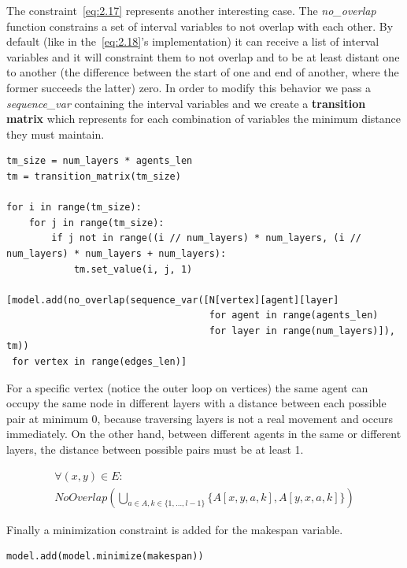 \documentclass[12pt, a4paper, hidelinks]{article}
\numberwithin{equation}{section}
\begin{document}
The constraint~\ref{eq:2.17} represents another interesting case.
The \textit{no\_overlap} function constrains a set of interval variables to not overlap with each other.
By default (like in the~\ref{eq:2.18}'s implementation) it can receive a list of interval variables and it will constraint them to not overlap and to be at least distant one to another (the difference between the start of one and end of another, where the former succeeds the latter) zero.
In order to modify this behavior we pass a \textit{sequence\_var} containing the interval variables and we create a \textbf{transition matrix} which represents for each combination of variables the minimum distance they must maintain.

\begin{lstlisting}[label={lst:minimize2}]
tm_size = num_layers * agents_len
tm = transition_matrix(tm_size)

for i in range(tm_size):
    for j in range(tm_size):
        if j not in range((i // num_layers) * num_layers, (i // num_layers) * num_layers + num_layers):
            tm.set_value(i, j, 1)

[model.add(no_overlap(sequence_var([N[vertex][agent][layer]
                                    for agent in range(agents_len)
                                    for layer in range(num_layers)]), tm))
 for vertex in range(edges_len)]
\end{lstlisting}

For a specific vertex (notice the outer loop on vertices) the same agent can occupy the same node in different layers with a distance between each possible pair at minimum 0, because traversing layers is not a real movement and occurs immediately.
On the other hand, between different agents in the same or different layers, the distance between possible pairs must be at least 1.

\begin{description}\label{eq:equation_set_2.5}
\item \begin{equation}\begin{split} \forall (x, y) \in E: \\ NoOverlap(\bigcup_{a \in A, k \in \{1,\dots,l-1\}} \{A[x,y,a,k], A[y,x,a,k]\})\end{split}\label{eq:2.18}\end{equation}
\end{description}

Finally a minimization constraint is added for the makespan variable.
\begin{lstlisting}[label={lst:minimize2}]
model.add(model.minimize(makespan))
\end{lstlisting}
\end{document}
